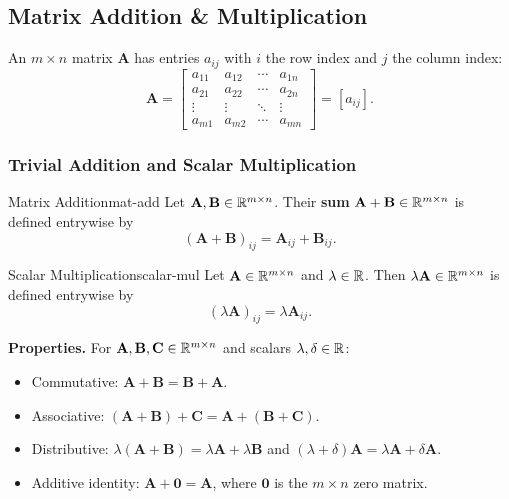 \subsection{Matrix Addition \& Multiplication}

An $m \times n$ matrix $\mathbf{A}$ has entries $a_{ij}$ with $i$ the row index and $j$ the column index:
\[
  \mathbf{A}
  =
  \begin{bmatrix}
    a_{11} & a_{12} & \cdots & a_{1n} \\
    a_{21} & a_{22} & \cdots & a_{2n} \\
    \vdots & \vdots & \ddots & \vdots \\
    a_{m1} & a_{m2} & \cdots & a_{mn}
  \end{bmatrix}
  = [a_{ij}].
\]

\subsubsection{Trivial Addition and Scalar Multiplication}

\begin{definition}{Matrix Addition}{mat-add}
  Let $\mathbf{A}, \mathbf{B} \in \mathbb{R}^{m \times n}$. Their \textbf{sum} $\mathbf{A} + \mathbf{B} \in \mathbb{R}^{m \times n}$ is defined entrywise by
  \[
    (\mathbf{A} + \mathbf{B})_{ij} = \mathbf{A}_{ij} + \mathbf{B}_{ij}.
  \]
\end{definition}

\begin{definition}{Scalar Multiplication}{scalar-mul}
  Let $\mathbf{A} \in \mathbb{R}^{m \times n}$ and $\lambda \in \mathbb{R}$. Then $\lambda \mathbf{A} \in \mathbb{R}^{m \times n}$ is defined entrywise by
  \[
    (\lambda \mathbf{A})_{ij} = \lambda \mathbf{A}_{ij}.
  \]
\end{definition}

\textbf{Properties.} For $\mathbf{A}, \mathbf{B}, \mathbf{C} \in \mathbb{R}^{m \times n}$ and scalars $\lambda, \delta \in \mathbb{R}$:
\begin{itemize}
  \item Commutative: $\mathbf{A} + \mathbf{B} = \mathbf{B} + \mathbf{A}$.
  \item Associative: $(\mathbf{A} + \mathbf{B}) + \mathbf{C} = \mathbf{A} + (\mathbf{B} + \mathbf{C})$.
  \item Distributive: $\lambda(\mathbf{A} + \mathbf{B}) = \lambda \mathbf{A} + \lambda \mathbf{B}$ and $(\lambda + \delta)\mathbf{A} = \lambda \mathbf{A} + \delta \mathbf{A}$.
  \item Additive identity: $\mathbf{A} + \mathbf{0} = \mathbf{A}$, where $\mathbf{0}$ is the $m \times n$ zero matrix.
\end{itemize}

